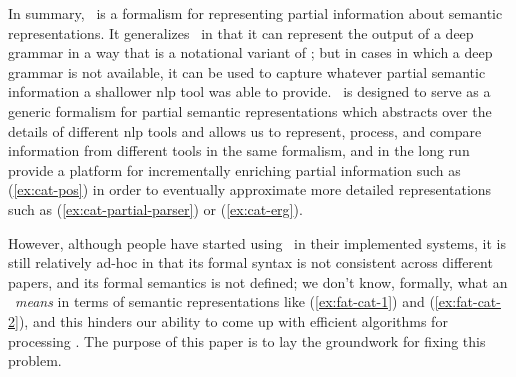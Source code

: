In summary, \rmrs\ is a formalism for representing partial information
about semantic representations.  It generalizes \mrs\ in that it can
represent the output of a deep grammar in a way that is a notational
variant of \mrs; but in cases in which a deep grammar is not
available, it can be used to capture whatever partial semantic
information a shallower {\sc nlp} tool was able to provide.  \rmrs\ is
designed to serve as a generic formalism for partial semantic
representations which abstracts over the details of different {\sc nlp}
tools and allows us to represent, process, and compare information
from different tools in the same formalism, and in the long run
provide a platform for incrementally enriching partial information
such as (\ref{ex:cat-pos}) in order to eventually approximate more
detailed representations such as (\ref{ex:cat-partial-parser}) or
(\ref{ex:cat-erg}).

However, although people have started using \rmrs\ in their
implemented systems, it is still relatively ad-hoc in that its formal
syntax is not consistent across different papers, and its formal
semantics is not defined; we don't know, formally, what an \rmrs\
\emph{means} in terms of semantic representations like
(\ref{ex:fat-cat-1}) and (\ref{ex:fat-cat-2}), and this hinders our
ability to come up with efficient algorithms for processing \rmrs. The
purpose of this paper is to lay the groundwork for fixing this problem.

